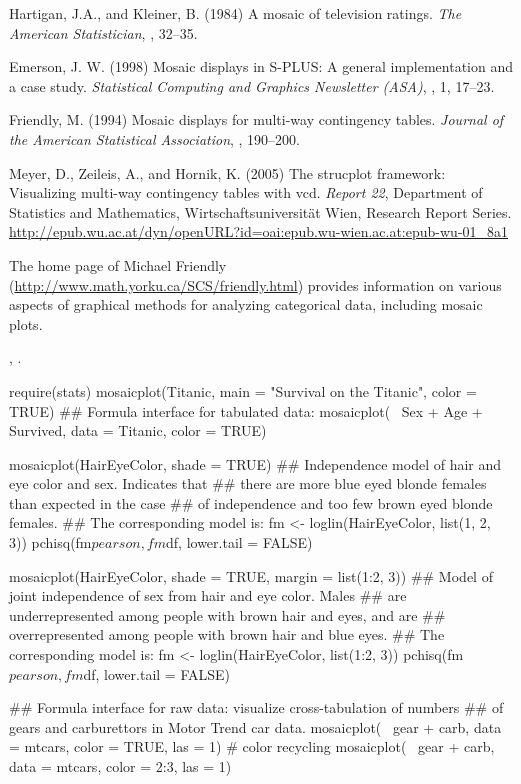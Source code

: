 \begin{References}\relax
Hartigan, J.A., and Kleiner, B. (1984)
A mosaic of television ratings. \emph{The American Statistician},
, 32--35.

Emerson, J. W. (1998)
Mosaic displays in S-PLUS: A general implementation and a case study.
\emph{Statistical Computing and Graphics Newsletter (ASA)},
, 1, 17--23.

Friendly, M. (1994)
Mosaic displays for multi-way contingency tables.
\emph{Journal of the American Statistical Association}, ,
190--200.

Meyer, D., Zeileis, A., and Hornik, K. (2005)
The strucplot framework: Visualizing multi-way contingency tables with vcd.
\emph{Report 22}, Department of Statistics and Mathematics, 
Wirtschaftsuniversität Wien, Research Report Series.
\url{http://epub.wu.ac.at/dyn/openURL?id=oai:epub.wu-wien.ac.at:epub-wu-01_8a1}

The home page of Michael Friendly
(\url{http://www.math.yorku.ca/SCS/friendly.html}) provides
information on various aspects of graphical methods for analyzing
categorical data, including mosaic plots.
\end{References}
%
\begin{SeeAlso}\relax
{},
.
\end{SeeAlso}
%
\begin{Examples}
\begin{ExampleCode}
require(stats)
mosaicplot(Titanic, main = "Survival on the Titanic", color = TRUE)
## Formula interface for tabulated data:
mosaicplot(~ Sex + Age + Survived, data = Titanic, color = TRUE)

mosaicplot(HairEyeColor, shade = TRUE)
## Independence model of hair and eye color and sex.  Indicates that
## there are more blue eyed blonde females than expected in the case 
## of independence and too few brown eyed blonde females.
## The corresponding model is:
fm <- loglin(HairEyeColor, list(1, 2, 3))
pchisq(fm$pearson, fm$df, lower.tail = FALSE)

mosaicplot(HairEyeColor, shade = TRUE, margin = list(1:2, 3))
## Model of joint independence of sex from hair and eye color.  Males
## are underrepresented among people with brown hair and eyes, and are
## overrepresented among people with brown hair and blue eyes.
## The corresponding model is:
fm <- loglin(HairEyeColor, list(1:2, 3))
pchisq(fm$pearson, fm$df, lower.tail = FALSE)

## Formula interface for raw data: visualize cross-tabulation of numbers
## of gears and carburettors in Motor Trend car data.
mosaicplot(~ gear + carb, data = mtcars, color = TRUE, las = 1)
# color recycling
mosaicplot(~ gear + carb, data = mtcars, color = 2:3, las = 1)
\end{ExampleCode}
\end{Examples}
